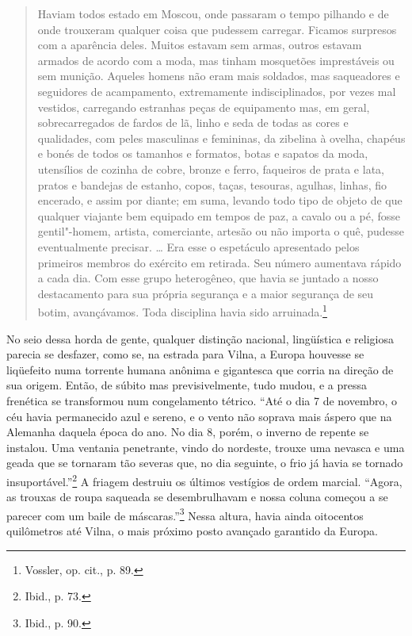 \begin{quote}
Haviam todos estado em Moscou, onde passaram o tempo pilhando e de onde
trouxeram qualquer coisa que pudessem carregar. Ficamos surpresos com a
aparência deles. Muitos estavam sem armas, outros estavam armados de
acordo com a moda, mas tinham mosquetões imprestáveis ou sem munição.
Aqueles homens não eram mais soldados, mas saqueadores e seguidores de
acampamento, extremamente indisciplinados, por vezes mal vestidos,
carregando estranhas peças de equipamento mas, em geral, sobrecarregados
de fardos de lã, linho e seda de todas as cores e qualidades, com peles
masculinas e femininas, da zibelina à ovelha, chapéus e bonés de todos
os tamanhos e formatos, botas e sapatos da moda, utensílios de cozinha
de cobre, bronze e ferro, faqueiros de prata e lata, pratos e bandejas
de estanho, copos, taças, tesouras, agulhas, linhas, fio encerado, e
assim por diante; em suma, levando todo tipo de objeto de que qualquer
viajante bem equipado em tempos de paz, a cavalo ou a pé, fosse
gentil"-homem, artista, comerciante, artesão ou não importa o quê,
pudesse eventualmente precisar. \ldots{} Era esse o espetáculo
apresentado pelos primeiros membros do exército em retirada. Seu número
aumentava rápido a cada dia. Com esse grupo heterogêneo, que havia se
juntado a nosso destacamento para sua própria segurança e a maior
segurança de seu botim, avançávamos. Toda disciplina havia sido
arruinada.\footnote{Vossler, op. cit., p. 89.}
\end{quote}

No seio dessa horda de gente, qualquer distinção nacional, lingüística e
religiosa parecia se desfazer, como se, na estrada para Vilna, a Europa
houvesse se liqüefeito numa torrente humana anônima e gigantesca que
corria na direção de sua origem. Então, de súbito mas previsivelmente,
tudo mudou, e a pressa frenética se transformou num congelamento
tétrico. ``Até o dia 7 de novembro, o céu havia permanecido azul e
sereno, e o vento não soprava mais áspero que na Alemanha daquela época
do ano. No dia 8, porém, o inverno de repente se instalou. Uma ventania
penetrante, vindo do nordeste, trouxe uma nevasca e uma geada que se
tornaram tão severas que, no dia seguinte, o frio já havia se tornado
insuportável.''\footnote{Ibid., p. 73.} A friagem destruiu os últimos
vestígios de ordem marcial. ``Agora, as trouxas de roupa saqueada se
desembrulhavam e nossa coluna começou a se parecer com um baile de
máscaras.''\footnote{Ibid., p. 90.} Nessa altura, havia ainda oitocentos
quilômetros até Vilna, o mais próximo posto avançado garantido da
Europa.

